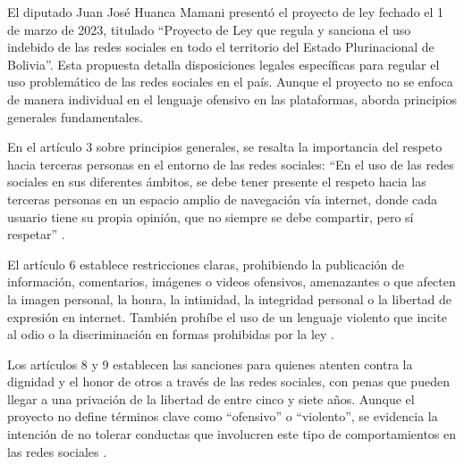 El diputado Juan José Huanca Mamani presentó el proyecto de ley fechado el 1 de marzo de 2023, titulado ``Proyecto de Ley que regula y sanciona el uso indebido de las redes sociales en todo el territorio del Estado Plurinacional de Bolivia''. Esta propuesta detalla disposiciones legales específicas para regular el uso problemático de las redes sociales en el país. Aunque el proyecto no se enfoca de manera individual en el lenguaje ofensivo en las plataformas, aborda principios generales fundamentales.

En el artículo 3 sobre principios generales, se resalta la importancia del respeto hacia terceras personas en el entorno de las redes sociales: ``En el uso de las redes sociales en sus diferentes ámbitos, se debe tener presente el respeto hacia las terceras personas en un espacio amplio de navegación vía internet, donde cada usuario tiene su propia opinión, que no siempre se debe compartir, pero sí respetar'' \cite[Articulo 3, PL. 304 2022-2023]{diputados2023ley}.

El artículo 6 establece restricciones claras, prohibiendo la publicación de información, comentarios, imágenes o videos ofensivos, amenazantes o que afecten la imagen personal, la honra, la intimidad, la integridad personal o la libertad de expresión en internet. También prohíbe el uso de un lenguaje violento que incite al odio o la discriminación en formas prohibidas por la ley \cite[Articulo 6, PL. 304 2022-2023]{diputados2023ley}.

Los artículos 8 y 9 establecen las sanciones para quienes atenten contra la dignidad y el honor de otros a través de las redes sociales, con penas que pueden llegar a una privación de la libertad de entre cinco y siete años.
Aunque el proyecto no define términos clave como ``ofensivo'' o ``violento'', se evidencia la intención de no tolerar conductas que involucren este tipo de comportamientos en las redes sociales \cite[Articulo 3, PL. 304 2022-2023]{diputados2023ley}.
